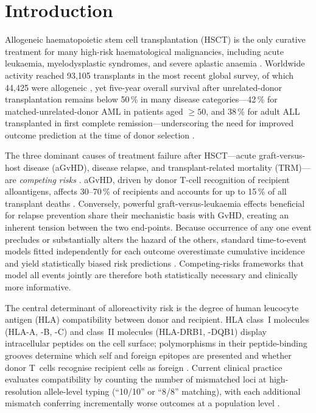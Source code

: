\documentclass[11pt,a4paper]{article}
\begin{document}
\newpage

\section{Introduction}

Allogeneic haematopoietic stem cell transplantation (HSCT) is the only
curative treatment for many high-risk haematological malignancies, including
acute leukaemia, myelodysplastic syndromes, and severe aplastic anaemia
\citep{appelbaum2001hsct, passweg2022ebmt}.  Worldwide activity reached
93{,}105 transplants in the most recent global survey, of which 44{,}425 were
allogeneic \citep{atsuta2024wbmt}, yet five-year overall survival after
unrelated-donor transplantation remains below 50\,\% in many disease
categories---42\,\% for matched-unrelated-donor AML in patients aged
$\geq 50$, and 38\,\% for adult ALL transplanted in first complete
remission---underscoring the need for improved outcome prediction at the time
of donor selection \citep{gratwohl2009risk, passweg2022ebmt}.

The three dominant causes of treatment failure after HSCT---acute
graft-versus-host disease (aGvHD), disease relapse, and transplant-related
mortality (TRM)---are \emph{competing risks} \citep{fine1999subdistribution}.
aGvHD, driven by donor T-cell recognition of recipient alloantigens, affects
30--70\,\% of recipients and accounts for up to 15\,\% of all transplant deaths
\citep{ferrara2009gvhd, zeiser2017gvhd}.  Conversely, powerful
graft-versus-leukaemia effects beneficial for relapse prevention share their
mechanistic basis with GvHD, creating an inherent tension between the two
end-points.  Because occurrence of any one event precludes or substantially
alters the hazard of the others, standard time-to-event models fitted
independently for each outcome overestimate cumulative incidence and yield
statistically biased risk predictions \citep{fine1999subdistribution,
holtan2015gvhd}.  Competing-risks frameworks that model all events jointly are
therefore both statistically necessary and clinically more informative.

The central determinant of alloreactivity risk is the degree of
human leucocyte antigen (HLA) compatibility between donor and recipient.
HLA class~I molecules (HLA-A, -B, -C) and class~II molecules (HLA-DRB1,
-DQB1) display intracellular peptides on the cell surface; polymorphisms in
their peptide-binding grooves determine which self and foreign epitopes are
presented and whether donor T~cells recognise recipient cells as foreign
\citep{stern1994hla}.  Current clinical practice evaluates compatibility by
counting the number of mismatched loci at high-resolution allele-level typing
(``10/10'' or ``8/8'' matching), with each additional mismatch conferring
incrementally worse outcomes at a population level \citep{lee2007hlamismatch,
petersdorf2013hla}.
\end{document}

